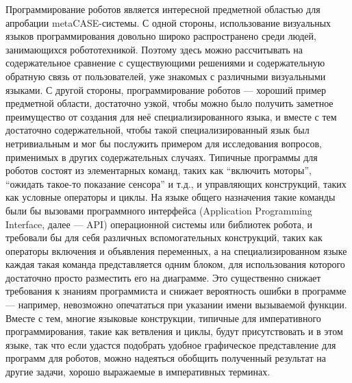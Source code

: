 \documentclass[a4paper]{article}
\begin{document}
Программирование роботов является интересной предметной областью для апробации metaCASE-системы. С одной стороны, использование визуальных языков программирования довольно широко распространено среди людей, занимающихся робототехникой. Поэтому здесь можно рассчитывать на содержательное сравнение с существующими решениями и содержательную обратную связь от пользователей, уже знакомых с различными визуальными языками. С другой стороны, программирование роботов --- хороший пример предметной области, достаточно узкой, чтобы можно было получить заметное преимущество от создания для неё специализированного языка, и вместе с тем достаточно содержательной, чтобы такой специализированный язык был нетривиальным и мог бы послужить примером для исследования вопросов, применимых в других содержательных случаях. Типичные программы для роботов состоят из элементарных команд, таких как ``включить моторы'', ``ожидать такое-то показание сенсора'' и т.д., и управляющих конструкций, таких как условные операторы и циклы. На языке общего назначения такие команды были бы вызовами программного интерфейса (Application Programming Interface, далее --- API) операционной системы или библиотек робота, и требовали бы для себя различных вспомогательных конструкций, таких как операторы включения и объявления переменных, а на специализированном языке каждая такая команда представляется одним блоком, для использования которого достаточно просто разместить его на диаграмме. Это существенно снижает требования к знаниям программиста и снижает вероятность ошибки в программе --- например, невозможно опечататься при указании имени вызываемой функции. Вместе с тем, многие языковые конструкции, типичные для императивного программирования, такие как ветвления и циклы, будут присутствовать и в этом языке, так что если удастся подобрать удобное графическое представление для программ для роботов, можно надеяться обобщить полученный результат на другие задачи, хорошо выражаемые в императивных терминах.
\end{document}
